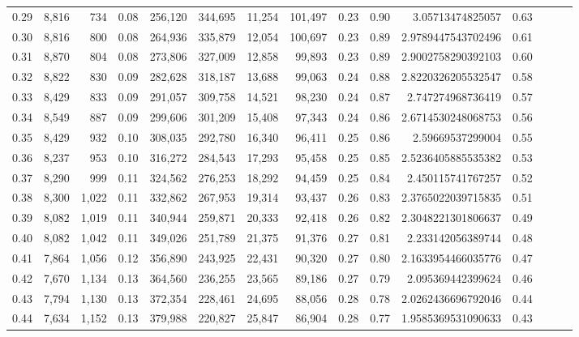 \begin{tabular}{rrrrrrrrrrrrrrr}
0.29 &  8,816 &    734 &  0.08 &  256,120 &  344,695 &   11,254 &  101,497 &  0.23 &  0.90 &      3.05713474825057 &      0.63 \\
0.30 &  8,816 &    800 &  0.08 &  264,936 &  335,879 &   12,054 &  100,697 &  0.23 &  0.89 &    2.9789447543702496 &      0.61 \\
0.31 &  8,870 &    804 &  0.08 &  273,806 &  327,009 &   12,858 &   99,893 &  0.23 &  0.89 &    2.9002758290392103 &      0.60 \\
0.32 &  8,822 &    830 &  0.09 &  282,628 &  318,187 &   13,688 &   99,063 &  0.24 &  0.88 &    2.8220326205532547 &      0.58 \\
0.33 &  8,429 &    833 &  0.09 &  291,057 &  309,758 &   14,521 &   98,230 &  0.24 &  0.87 &     2.747274968736419 &      0.57 \\
0.34 &  8,549 &    887 &  0.09 &  299,606 &  301,209 &   15,408 &   97,343 &  0.24 &  0.86 &    2.6714530248068753 &      0.56 \\
0.35 &  8,429 &    932 &  0.10 &  308,035 &  292,780 &   16,340 &   96,411 &  0.25 &  0.86 &      2.59669537299004 &      0.55 \\
0.36 &  8,237 &    953 &  0.10 &  316,272 &  284,543 &   17,293 &   95,458 &  0.25 &  0.85 &    2.5236405885535382 &      0.53 \\
0.37 &  8,290 &    999 &  0.11 &  324,562 &  276,253 &   18,292 &   94,459 &  0.25 &  0.84 &     2.450115741767257 &      0.52 \\
0.38 &  8,300 &  1,022 &  0.11 &  332,862 &  267,953 &   19,314 &   93,437 &  0.26 &  0.83 &    2.3765022039715835 &      0.51 \\
0.39 &  8,082 &  1,019 &  0.11 &  340,944 &  259,871 &   20,333 &   92,418 &  0.26 &  0.82 &    2.3048221301806637 &      0.49 \\
0.40 &  8,082 &  1,042 &  0.11 &  349,026 &  251,789 &   21,375 &   91,376 &  0.27 &  0.81 &     2.233142056389744 &      0.48 \\
0.41 &  7,864 &  1,056 &  0.12 &  356,890 &  243,925 &   22,431 &   90,320 &  0.27 &  0.80 &    2.1633954466035776 &      0.47 \\
0.42 &  7,670 &  1,134 &  0.13 &  364,560 &  236,255 &   23,565 &   89,186 &  0.27 &  0.79 &     2.095369442399624 &      0.46 \\
0.43 &  7,794 &  1,130 &  0.13 &  372,354 &  228,461 &   24,695 &   88,056 &  0.28 &  0.78 &    2.0262436696792046 &      0.44 \\
0.44 &  7,634 &  1,152 &  0.13 &  379,988 &  220,827 &   25,847 &   86,904 &  0.28 &  0.77 &    1.9585369531090633 &      0.43 \\

\end{tabular}
